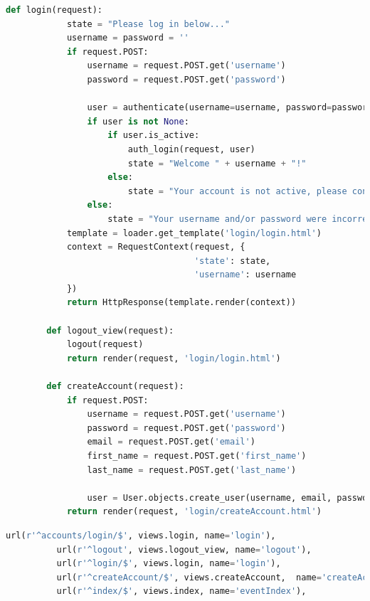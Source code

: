 \documentclass[draftclsnofoot,10pt,onecolumn]{IEEEtran} %
\begin{document}
\begin{center}
\captionsetup{width=.5\linewidth}
  \begin{lstlisting}[caption=Views.py file that handles the creation of accounts and the login page view, language=Python]
        def login(request):
            state = "Please log in below..."
            username = password = ''
            if request.POST:
                username = request.POST.get('username')
                password = request.POST.get('password')

                user = authenticate(username=username, password=password)
                if user is not None:
                    if user.is_active:
                        auth_login(request, user)
                        state = "Welcome " + username + "!"
                    else:
                        state = "Your account is not active, please contact the site admin."
                else:
                    state = "Your username and/or password were incorrect."
            template = loader.get_template('login/login.html')
            context = RequestContext(request, {
                                     'state': state,
                                     'username': username
            })
            return HttpResponse(template.render(context))

        def logout_view(request):
            logout(request)
            return render(request, 'login/login.html')

        def createAccount(request):
            if request.POST:
                username = request.POST.get('username')
                password = request.POST.get('password')
                email = request.POST.get('email')
                first_name = request.POST.get('first_name')
                last_name = request.POST.get('last_name')

                user = User.objects.create_user(username, email, password)
            return render(request, 'login/createAccount.html')
      \end{lstlisting}
    \end{center}

    \begin{center}
    \captionsetup{width=.5\linewidth}
        \begin{lstlisting}[caption=urls.py file where the destinations are stored for login and logout, language=Python]
          url(r'^accounts/login/$', views.login, name='login'),
          url(r'^logout', views.logout_view, name='logout'),
          url(r'^login/$', views.login, name='login'),
          url(r'^createAccount/$', views.createAccount,  name='createAccount'),
          url(r'^index/$', views.index, name='eventIndex'),
      \end{lstlisting}
    \end{center}
\end{document}
